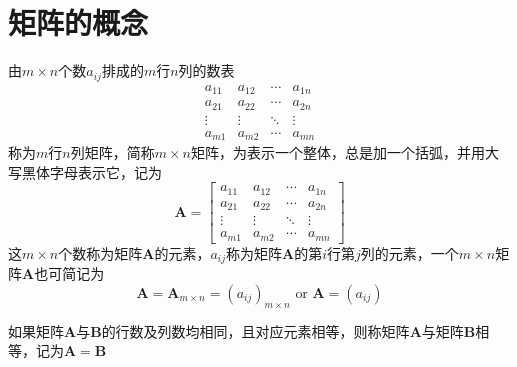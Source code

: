 \documentclass[UTF8]{ctexart}
\newcommand{\ve}[1]{{\bm{#1}}}
\newcommand{\mat}[1]{\ve{#1}}
\newcommand{\emplin}{\vspace{1em}}
\begin{document}
\section*{矩阵的概念}
由$m\times n$个数$a_{ij}$排成的$m$行$n$列的数表
\[\begin{matrix}
a_{11}&a_{12}&\cdots&a_{1n}\\
a_{21}&a_{22}&\cdots&a_{2n}\\
\vdots&\vdots&\ddots&\vdots\\
a_{m1}&a_{m2}&\cdots&a_{mn}
\end{matrix}\]
称为$m$行$n$列矩阵，简称$m\times n$矩阵，为表示一个整体，总是加一个括弧，并用大写黑体字母表示它，记为
\[\mat{A}=
\begin{bmatrix}
a_{11}&a_{12}&\cdots&a_{1n}\\
a_{21}&a_{22}&\cdots&a_{2n}\\
\vdots&\vdots&\ddots&\vdots\\
a_{m1}&a_{m2}&\cdots&a_{mn}
\end{bmatrix}\]
这$m\times n$个数称为矩阵$\mat{A}$的元素，$a_{ij}$称为矩阵$\mat{A}$的第$i$行第$j$列的元素，一个$m\times n$矩阵$\mat{A}$也可简记为
\[\mat{A}=\mat{A}_{m\times n}=(a_{ij})_{m\times n}\text{ or }\mat{A}=(a_{ij})\]

\emplin

如果矩阵$\mat{A}$与$\mat{B}$的行数及列数均相同，且对应元素相等，则称矩阵$\mat{A}$与矩阵$\mat{B}$相等，记为$\mat{A}=\mat{B}$
\end{document}
